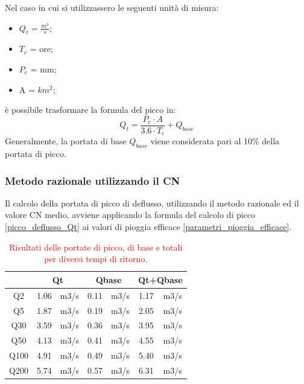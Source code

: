 Nel caso in cui si utilizzassero le seguenti unità di misura:
\begin{itemize}
    \item $Q_t$ = $\frac{m^3}{s}$;
    \item $T_c$ = ore;
    \item $P_e$ = mm;
    \item A = $km^2$;
\end{itemize}
è possibile trasformare la formula del picco in:
\begin{equation}
    Q_t = \frac{P_e \cdot A}{3.6 \cdot T_c} + Q_{base}
    \label{picco_deflusso_Qt}
\end{equation}
Generalmente, la portata di base $Q_{base}$ viene considerata pari al 10\% della portata di picco.

\subsubsection{Metodo razionale utilizzando il CN}
Il calcolo della portata di picco di deflusso, utilizzando il metodo razionale ed il valore CN medio, avviene applicando la formula del calcolo di picco \ref{picco_deflusso_Qt} ai valori di pioggia efficace \ref{parametri_pioggia_efficace}.

\begin{table}[H] \centering
    \caption{\textcolor{red}{Risultati delle portate di picco, di base e totali per diversi tempi di ritorno.}}
    \begin{tabular}{ccccccc}
    \toprule
         & \multicolumn{2}{c}{Qt} & \multicolumn{2}{c}{Qbase} & \multicolumn{2}{c}{Qt+Qbase} \\
    \midrule
    Q2   & 1.06       & m3/s      & 0.11        & m3/s        & 1.17          & m3/s         \\
    Q5   & 1.87       & m3/s      & 0.19        & m3/s        & 2.05          & m3/s         \\
    Q30  & 3.59       & m3/s      & 0.36        & m3/s        & 3.95          & m3/s         \\
    Q50  & 4.13       & m3/s      & 0.41        & m3/s        & 4.55          & m3/s         \\
    Q100 & 4.91       & m3/s      & 0.49        & m3/s        & 5.40          & m3/s         \\
    Q200 & 5.74       & m3/s      & 0.57        & m3/s        & 6.31          & m3/s  \\
    \bottomrule      
    \end{tabular}
    \end{table}


